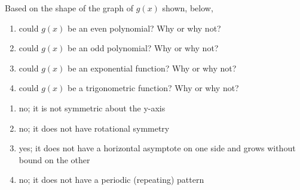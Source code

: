 {Based on the shape of the graph of $g(x)$ shown, below,
\label{fig:01_05_ex_23}
\begin{enumerate}[label=(\alph*)]
\item could $g(x)$ be an even polynomial? Why or why not?
\item could $g(x)$ be an odd polynomial? Why or why not?
\item could $g(x)$ be an exponential function? Why or why not?
\item could $g(x)$ be a trigonometric function? Why or why not?
\end{enumerate}}
{\begin{enumerate}[label=(\alph*)]
	\item no; it is not symmetric about the y-axis
	\item no; it does not have rotational symmetry
	\item yes; it does not have a horizontal asymptote on one side and grows without bound on the other
	\item no; it does not have a periodic (repeating) pattern
\end{enumerate}}
